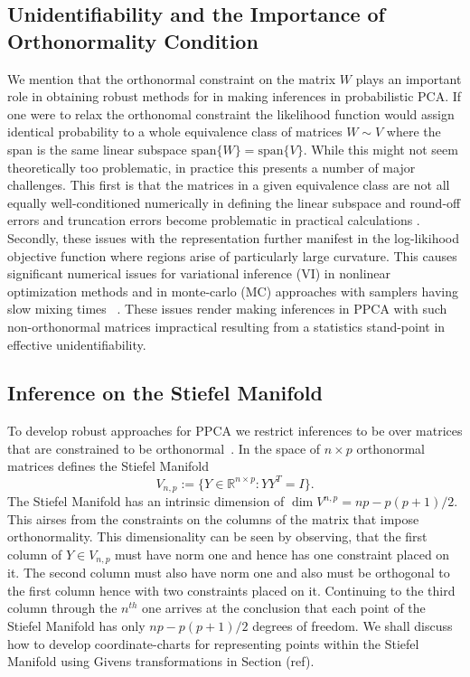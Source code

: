 \documentclass{article}
\begin{document}
\subsection{Unidentifiability and the Importance of Orthonormality Condition}
We mention that the orthonormal constraint on the matrix $W$ plays an important role in obtaining robust methods for
in making inferences in probabilistic PCA.  If one were to relax the orthonomal constraint the likelihood function would assign identical probability to a whole equivalence class of matrices $W \sim V$ where the span is the same linear subspace $\mbox{span}\{W\} = \mbox{span}\{V\}$.  While this might not seem theoretically too problematic, in practice this presents a number of major challenges.  This first is that the matrices in a given equivalence class are not all equally well-conditioned numerically in defining the linear subspace and round-off errors and truncation errors become problematic in practical calculations .  Secondly, these issues with the representation further manifest in the log-likihood objective function where regions arise of particularly large curvature.  This causes significant numerical issues for variational inference (VI) in nonlinear optimization methods and in monte-carlo (MC) approaches with samplers having slow mixing times~
\citet[chapt.~12.1.3]{murphy2012machine, mohamed2009bayesian,holbrook2016bayesian}.  These issues render making inferences in PPCA with such non-orthonormal matrices impractical resulting from a statistics stand-point in effective unidentifiability.

\subsection{Inference on the Stiefel Manifold}
To develop robust approaches for PPCA we restrict inferences to be over matrices that are constrained to be orthonormal~\citet[chapt.~12.1.3]{murphy2012machine}.  In the space of $n\times p$ orthonormal matrices defines the Stiefel Manifold~\citep{muirhead2009aspects}
\begin{equation}
V_{n,p} := \{Y \in \mathbb{R}^{n \times p}: YY^T = I \}.
\end{equation}
The Stiefel Manifold has an intrinsic dimension of $\dim{V^{n,p}} = np-p(p+1)/2$.  This airses from the constraints on the columns of the matrix that impose orthonormality.  This dimensionality can be seen by observing, that the first column of $Y \in V_{n,p}$ must have norm one and hence has one constraint placed on it. The second column must also have norm one and also must be orthogonal to the first column hence with two constraints placed on it.  Continuing to the third column through the $n^{th}$ one arrives at the conclusion that each point of the Stiefel Manifold has only $np-p(p+1)/2$ degrees of freedom.  We shall discuss how to develop coordinate-charts for  representing points within the Stiefel Manifold using Givens transformations in Section (ref).
\end{document}
